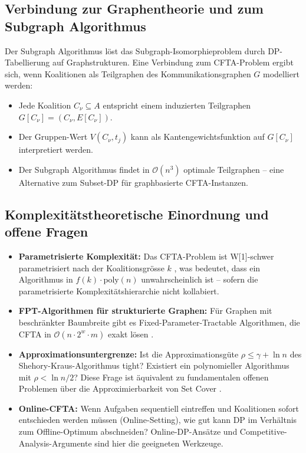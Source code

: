 \documentclass[a4paper,12pt]{article}
\theoremstyle{definition}
\begin{document}
\subsection{Verbindung zur Graphentheorie und zum Subgraph Algorithmus}

Der Subgraph Algorithmus \cite{epp2026subgraph} l\"{o}st das Subgraph-Isomorphieproblem
durch DP-Tabellierung auf Graphstrukturen. Eine Verbindung zum CFTA-Problem ergibt sich,
wenn Koalitionen als Teilgraphen des Kommunikationsgraphen $G$ modelliert werden:

\begin{itemize}
    \item Jede Koalition $C_\nu \subseteq A$ entspricht einem induzierten
          Teilgraphen $G[C_\nu] = (C_\nu, E[C_\nu])$.
    \item Der Gruppen-Wert $V(C_\nu, t_j)$ kann als Kantengewichtsfunktion
          auf $G[C_\nu]$ interpretiert werden.
    \item Der Subgraph Algorithmus findet in $\mathcal{O}(n^3)$ optimale
          Teilgraphen -- eine Alternative zum Subset-DP f\"{u}r graphbasierte
          CFTA-Instanzen.
\end{itemize}

\subsection{Komplexit\"{a}tstheoretische Einordnung und offene Fragen}

\begin{itemize}
    \item \textbf{Parametrisierte Komplexit\"{a}t:} Das CFTA-Problem ist
          W[1]-schwer parametrisiert nach der Koalitionsgr\"{o}sse $k$
          \cite{cygan2015}, was bedeutet, dass ein Algorithmus in
          $f(k) \cdot \mathrm{poly}(n)$ unwahrscheinlich ist -- sofern die
          parametrisierte Komplexit\"{a}tshierarchie nicht kollabiert.
    \item \textbf{FPT-Algorithmen f\"{u}r strukturierte Graphen:} F\"{u}r
          Graphen mit beschr\"{a}nkter Baumbreite gibt es Fixed-Parameter-Tractable
          Algorithmen, die CFTA in $\mathcal{O}(n \cdot 2^w \cdot m)$ exakt l\"{o}sen
          \cite{cygan2015}.
    \item \textbf{Approximationsuntergrenze:} Ist die Approximationsg\"{u}te
          $\rho \leq \gamma + \ln n$ des Shehory-Kraus-Algorithmus tight?
          Existiert ein polynomieller Algorithmus mit $\rho < \ln n / 2$?
          Diese Frage ist \"{a}quivalent zu fundamentalen offenen Problemen
          \"{u}ber die Approximierbarkeit von Set Cover \cite{dinur2014}.
    \item \textbf{Online-CFTA:} Wenn Aufgaben sequentiell eintreffen und
          Koalitionen sofort entschieden werden m\"{u}ssen (Online-Setting),
          wie gut kann DP im Verh\"{a}ltnis zum Offline-Optimum abschneiden?
          Online-DP-Ans\"{a}tze und Competitive-Analysis-Argumente sind hier
          die geeigneten Werkzeuge.
\end{itemize}
\end{document}

